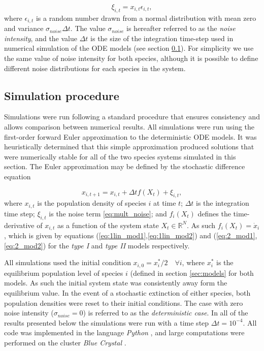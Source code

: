\begin{equation}
\xi_{i,t} = x_{i,t} \epsilon_{i,t},
\label{eq:mult_noise}
\end{equation}
%
where $\epsilon_{i,t}$ is a random number drawn from a normal distribution with mean zero and variance $\sigma_{noise}\Delta t$. The value $\sigma_{noise}$ is hereafter referred to as the \emph{noise intensity}, and the value $\Delta t$ is the size of the integration time-step used in numerical simulation of the ODE models (see section \ref{sec:simulation_method}). For simplicity we use the same value of noise intensity for both species, although it is possible to define different noise distributions for each species in the system.

\subsection{Simulation procedure}
\label{sec:simulation_method}

Simulations were run following a standard procedure that ensures consistency and allows comparison between numerical results. All simulations were run using the first-order forward Euler approximation to the deterministic ODE models. It was heuristically determined that this simple approximation produced solutions that were numerically stable for all of the two species systems simulated in this section. The Euler approximation may be defined by the stochastic difference equation

\begin{equation}
\label{eq:stochastic_diff}
x_{i, t+1} = x_{i, t} + \Delta t f(X_t) + \xi_{i,t},
\end{equation}
%
where $x_{i,t}$ is the population density of species $i$ at time $t$; $\Delta t$ is the integration time step; $\xi_{i,t}$ is the noise term \eqref{eq:mult_noise}; and $f_i(X_t)$ defines the time-derivative of $x_{i,t}$ as a function of the system state $X_t \in \mathbb{R}^N$. As such $f_i(X_t) = \dot{x}_i$, which is given by equations (\eqref{eq:1lin_mod1},\eqref{eq:1lin_mod2}) and (\eqref{eq:2_mod1},\eqref{eq:2_mod2}) for the \emph{type I} and \emph{type II} models respectively.

All simulations used the initial condition $x_{i,0} = x_i^*/2 \quad \forall i$, where $x_i^*$ is the equilibrium population level of species $i$ (defined in section \ref{sec:models} for both models. As such the initial system state was consistently away form the equilibrium value. In the event of a stochastic extinction of either species, both population densities were reset to their initial conditions. The case with zero noise intensity ($\sigma_{noise} = 0$) is referred to as the \emph{deterministic case}. In all of the results presented below the simulations were run with a time step $\Delta t = 10^{-4}$. All code was implemented in the language \emph{Python} \cite{python}, and large computations were performed on the cluster \emph{Blue Crystal} \cite{BC3}.

